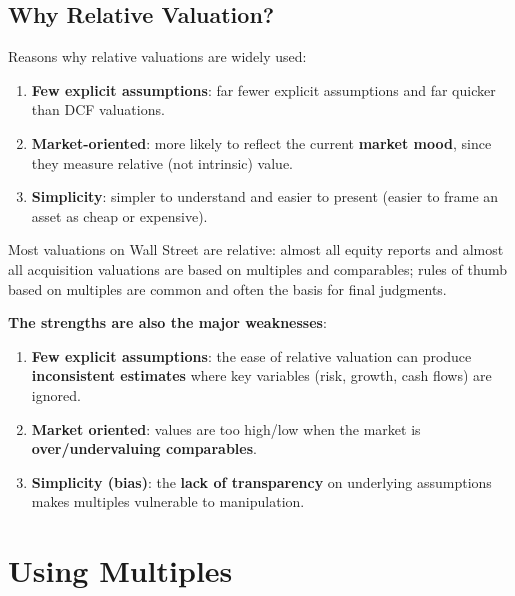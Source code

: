 \subsection{Why Relative Valuation?}
Reasons why relative valuations are widely used:
\begin{enumerate}
  \item \textbf{Few explicit assumptions}: far fewer explicit assumptions and far quicker than DCF valuations.
  \item \textbf{Market-oriented}: more likely to reflect the current \textbf{market mood}, since they measure relative (not intrinsic) value.
  \item \textbf{Simplicity}: simpler to understand and easier to present (easier to frame an asset as cheap or expensive).
\end{enumerate}
Most valuations on Wall Street are relative: almost all equity reports and almost all acquisition valuations are based on multiples and comparables; rules of thumb based on multiples are common and often the basis for final judgments.

\textbf{The strengths are also the major weaknesses}:
\begin{enumerate}
  \item \textbf{Few explicit assumptions}: the ease of relative valuation can produce \textbf{inconsistent estimates} where key variables (risk, growth, cash flows) are ignored.
  \item \textbf{Market oriented}: values are too high/low when the market is \textbf{over/undervaluing comparables}.
  \item \textbf{Simplicity (bias)}: the \textbf{lack of transparency} on underlying assumptions makes multiples vulnerable to manipulation.
\end{enumerate}

\section{Using Multiples}

